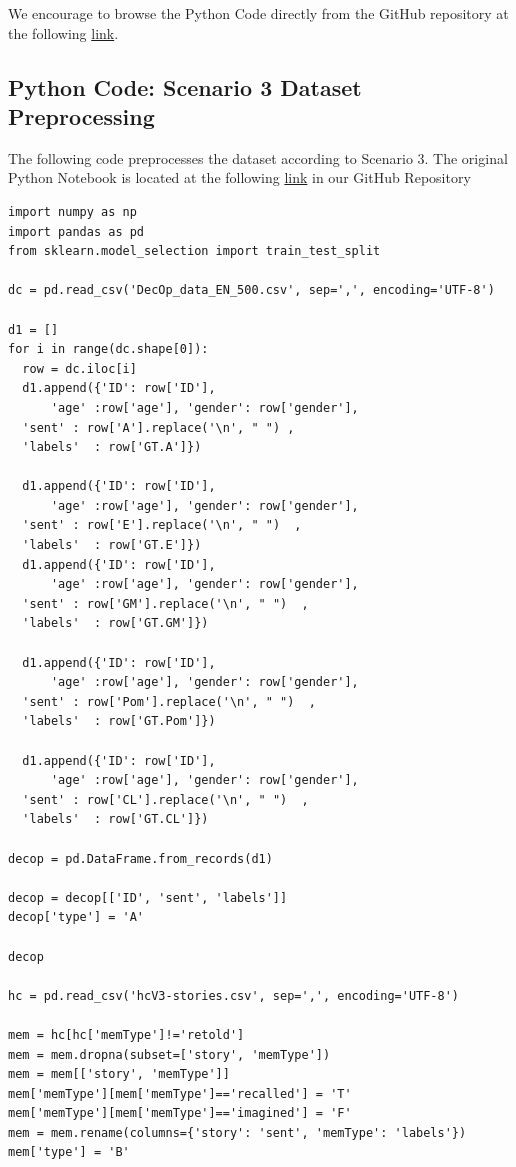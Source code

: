 \documentclass[10pt,twocolumn,letterpaper]{article}
\begin{document}
We encourage to browse the Python Code directly from the GitHub repository at the following \href{https://github.com/TannerAGraves/GPT-LieDetection/}{link}.

\subsection{Python Code: Scenario 3 Dataset Preprocessing}

The following code preprocesses the dataset according to Scenario 3.
The original Python Notebook is located at the following \href{https://colab.research.google.com/github/TannerAGraves/GPT-LieDetection/blob/main/dataset/datasets.ipynb}{link} in our GitHub Repository

\begin{verbatim}
import numpy as np
import pandas as pd
from sklearn.model_selection import train_test_split

dc = pd.read_csv('DecOp_data_EN_500.csv', sep=',', encoding='UTF-8')

d1 = []
for i in range(dc.shape[0]):
  row = dc.iloc[i]
  d1.append({'ID': row['ID'],
      'age' :row['age'], 'gender': row['gender'],
  'sent' : row['A'].replace('\n', " ") ,
  'labels'  : row['GT.A']})

  d1.append({'ID': row['ID'],
      'age' :row['age'], 'gender': row['gender'],
  'sent' : row['E'].replace('\n', " ")  ,
  'labels'  : row['GT.E']})
  d1.append({'ID': row['ID'],
      'age' :row['age'], 'gender': row['gender'],
  'sent' : row['GM'].replace('\n', " ")  ,
  'labels'  : row['GT.GM']})

  d1.append({'ID': row['ID'],
      'age' :row['age'], 'gender': row['gender'],
  'sent' : row['Pom'].replace('\n', " ")  ,
  'labels'  : row['GT.Pom']})

  d1.append({'ID': row['ID'],
      'age' :row['age'], 'gender': row['gender'],
  'sent' : row['CL'].replace('\n', " ")  ,
  'labels'  : row['GT.CL']})

decop = pd.DataFrame.from_records(d1)

decop = decop[['ID', 'sent', 'labels']]
decop['type'] = 'A'

decop

hc = pd.read_csv('hcV3-stories.csv', sep=',', encoding='UTF-8')

mem = hc[hc['memType']!='retold']
mem = mem.dropna(subset=['story', 'memType'])
mem = mem[['story', 'memType']]
mem['memType'][mem['memType']=='recalled'] = 'T'
mem['memType'][mem['memType']=='imagined'] = 'F'
mem = mem.rename(columns={'story': 'sent', 'memType': 'labels'})
mem['type'] = 'B'


\end{verbatim}
\end{document}
